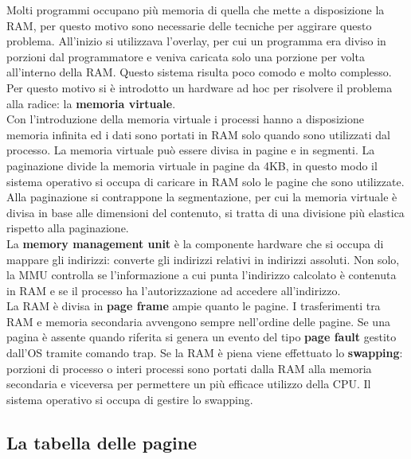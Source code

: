\documentclass{article}
\begin{document}
Molti programmi occupano più memoria di quella che mette a disposizione la RAM, per questo motivo sono necessarie delle tecniche per aggirare questo problema. All'inizio si utilizzava l'overlay, per cui un programma era diviso in porzioni dal programmatore e veniva caricata solo una porzione per volta all'interno della RAM. Questo sistema risulta poco comodo e molto complesso. Per questo motivo si è introdotto un hardware ad hoc per risolvere il problema alla radice:
la \textbf{memoria virtuale}.\\
Con l'introduzione della memoria virtuale i processi hanno a disposizione memoria infinita ed i dati sono portati in RAM solo quando sono utilizzati dal processo. La memoria virtuale può essere divisa in pagine e in segmenti. La paginazione divide la memoria virtuale in pagine da 4KB, in questo modo il sistema operativo si occupa di caricare in RAM solo le pagine che sono utilizzate. Alla paginazione si contrappone la segmentazione, per cui la memoria virtuale è divisa in base alle dimensioni del contenuto, si tratta di una divisione più elastica rispetto alla paginazione.\\
La \textbf{memory management unit} è la componente hardware che si occupa di mappare gli indirizzi: converte gli indirizzi relativi in indirizzi assoluti. Non solo, la MMU controlla se l'informazione a cui punta l'indirizzo calcolato è contenuta in RAM e se il processo ha l'autorizzazione ad accedere all'indirizzo.\\
La RAM è divisa in \textbf{page frame} ampie quanto le pagine. I trasferimenti tra RAM e memoria secondaria avvengono sempre nell'ordine delle pagine. Se una pagina è assente quando riferita si genera un evento del tipo \textbf{page fault} gestito dall'OS tramite comando trap. Se la RAM è piena viene effettuato lo \textbf{swapping}: porzioni di processo o interi processi sono portati dalla RAM alla memoria secondaria e viceversa per permettere un più efficace utilizzo della CPU. Il sistema operativo si occupa di gestire lo swapping.

\subsection{La tabella delle pagine} %
\end{document}
